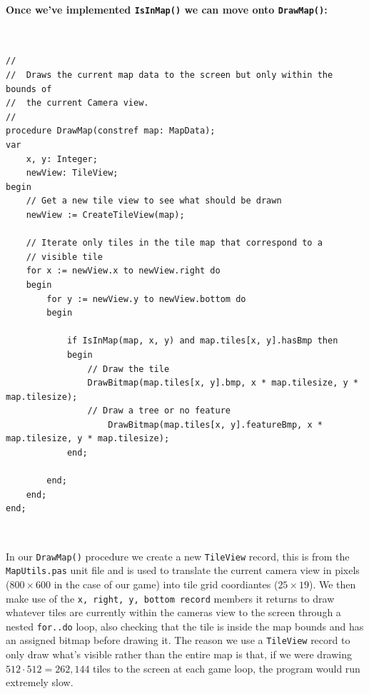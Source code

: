\documentclass{article}
\begin{document}
\paragraph{Once we've implemented \texttt{IsInMap()} we can move onto \texttt{DrawMap()}:} 
\
\vspace{0.5cm}

\begin{mdframed}[backgroundcolor=darkgray]
\begin{verbatim}
//
//	Draws the current map data to the screen but only within the bounds of
//	the current Camera view.
//
procedure DrawMap(constref map: MapData);
var
	x, y: Integer;
	newView: TileView;
begin
	// Get a new tile view to see what should be drawn
	newView := CreateTileView(map);

	// Iterate only tiles in the tile map that correspond to a
	// visible tile 
	for x := newView.x to newView.right do
  	begin
	  	for y := newView.y to newView.bottom do
	  	begin
	  		
	  		if IsInMap(map, x, y) and map.tiles[x, y].hasBmp then
	  		begin
	  			// Draw the tile
	  			DrawBitmap(map.tiles[x, y].bmp, x * map.tilesize, y * map.tilesize);
	  			// Draw a tree or no feature
					DrawBitmap(map.tiles[x, y].featureBmp, x * map.tilesize, y * map.tilesize);
	  		end;

	  	end;
  	end;
end;
\end{verbatim}
\end{mdframed}

\

In our \texttt{DrawMap()} procedure we create a new \texttt{TileView} record, this is from the \texttt{MapUtils.pas} unit file and is used to translate the current camera view in pixels ($800 \times 600$ in the case of our game) into tile grid coordiantes ($25 \times 19$). We then make use of the \texttt{x, right, y, bottom record} members it returns to draw whatever tiles are currently within the cameras view to the screen through a nested \texttt{for..do} loop, also checking that the tile is inside the map bounds and has an assigned bitmap before drawing it. The reason we use a \texttt{TileView} record to only draw what's visible rather than the entire map is that, if we were drawing $512 \cdot 512 = 262,144$ tiles to the screen at each game loop, the program would run extremely slow.
\end{document}
